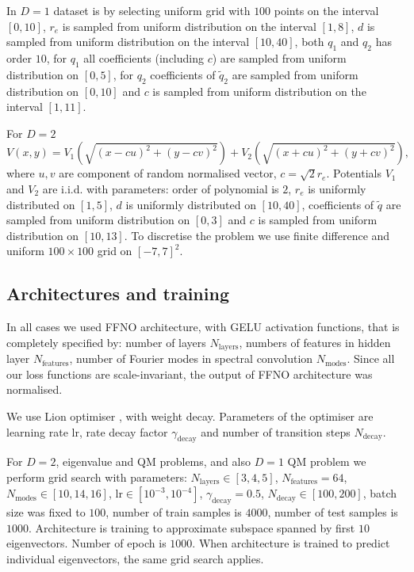 \documentclass{article}
\begin{document}
In $D=1$ dataset is by selecting uniform grid with $100$ points on the interval $[0, 10]$, $r_e$ is sampled from uniform distribution on the interval $[1, 8]$, $d$ is sampled from uniform distribution on the interval $[10, 40]$, both $q_1$ and $q_2$ has order $10$, for $q_1$ all coefficients (including $c$) are sampled from uniform distribution on $[0, 5]$, for $q_2$ coefficients of $\widetilde{q}_2$ are sampled from uniform distribution on $[0, 10]$ and $c$ is sampled from uniform distribution on the interval $[1, 11]$.

For $D=2$ 
\begin{equation}
	V(x, y) = V_1\left(\sqrt{(x - cu)^2 + (y - cv)^2}\right) + V_2\left(\sqrt{(x + cu)^2 + (y + cv)^2}\right),
\end{equation}
where $u, v$ are component of random normalised vector, $c = \sqrt{2} r_e$. Potentials $V_1$ and $V_2$ are i.i.d. with parameters: order of polynomial is $2$, $r_e$ is uniformly distributed on $[1, 5]$, $d$ is uniformly distributed on $[10, 40]$, coefficients of $\widetilde{q}$ are sampled from uniform distribution on $[0, 3]$ and $c$ is sampled from uniform distribution on $[10, 13]$. To discretise the problem we use finite difference and uniform $100\times 100$ grid on $[-7, 7]^2$.

\subsection{Architectures and training}
In all cases we used FFNO architecture, with GELU activation functions, that is completely specified by: number of layers $N_{\text{layers}}$, numbers of features in hidden layer $N_{\text{features}}$, number of Fourier modes in spectral convolution $N_{\text{modes}}$. Since all our loss functions are scale-invariant, the output of FFNO architecture was normalised.

We use Lion optimiser \cite{chen2023symbolic}, with weight decay. Parameters of the optimiser are learning rate $\text{lr}$, rate decay factor $\gamma_{\text{decay}}$ and number of transition steps $N_{\text{decay}}$.

For $D=2$, eigenvalue and QM problems, and also $D=1$ QM problem we perform grid search with parameters:  $N_{\text{layers}} \in [3, 4, 5]$, $N_{\text{features}} = 64$, $N_{\text{modes}} \in [10, 14, 16]$, $\text{lr}\in [10^{-3}, 10^{-4}]$, $\gamma_{\text{decay}} = 0.5$, $N_{\text{decay}} \in [100, 200]$, batch size was fixed to $100$, number of train samples is $4000$, number of test samples is $1000$. Architecture is training to approximate subspace spanned by first $10$ eigenvectors. Number of epoch is $1000$. When architecture is trained to predict individual eigenvectors, the same grid search applies.
\end{document}
